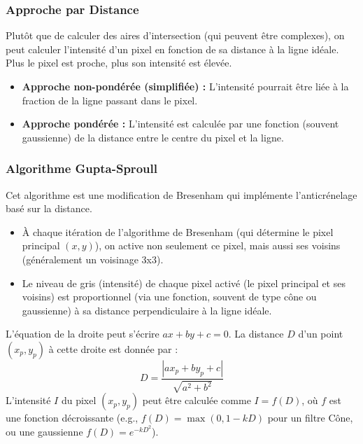 \documentclass{article}
\begin{document}
\subsubsection{Approche par Distance}
Plutôt que de calculer des aires d'intersection (qui peuvent être complexes), on peut calculer l'intensité d'un pixel en fonction de sa distance à la ligne idéale. Plus le pixel est proche, plus son intensité est élevée.

\begin{itemize}
    \item \textbf{Approche non-pondérée (simplifiée) :} L'intensité pourrait être liée à la fraction de la ligne passant dans le pixel.
    \item \textbf{Approche pondérée :} L'intensité est calculée par une fonction (souvent gaussienne) de la distance entre le centre du pixel et la ligne.
\end{itemize}

\subsubsection{Algorithme Gupta-Sproull}
Cet algorithme est une modification de Bresenham qui implémente l'anticrénelage basé sur la distance.
\begin{itemize}
    \item À chaque itération de l'algorithme de Bresenham (qui détermine le pixel principal $(x, y)$), on active non seulement ce pixel, mais aussi ses voisins (généralement un voisinage 3x3).
    \item Le niveau de gris (intensité) de chaque pixel activé (le pixel principal et ses voisins) est proportionnel (via une fonction, souvent de type cône ou gaussienne) à sa distance perpendiculaire à la ligne idéale.
\end{itemize}

L'équation de la droite peut s'écrire $ax + by + c = 0$. La distance $D$ d'un point $(x_p, y_p)$ à cette droite est donnée par :
\[ D = \frac{|ax_p + by_p + c|}{\sqrt{a^2 + b^2}} \]
L'intensité $I$ du pixel $(x_p, y_p)$ peut être calculée comme $I = f(D)$, où $f$ est une fonction décroissante (e.g., $f(D) = \max(0, 1 - kD)$ pour un filtre Cône, ou une gaussienne $f(D) = e^{-kD^2}$).
\end{document}
